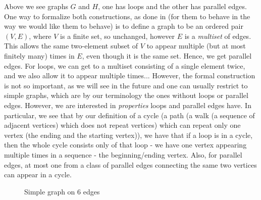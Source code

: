 Above we see graphs $G$ and $H$, one has loops and the other has parallel edges. One way to formalize both constructions, as done in \cite{oxley1} (for them to behave in the way we would like them to behave) is to define a graph to be an ordered pair $(V, E)$, where $V$ is a finite set, so unchanged, however $E$ is a \textit{multiset} of edges. This allows the same two-element subset of $V$ to appear multiple (but at most finitely many) times in $E$, even though it is the same set. Hence, we get parallel edges. For loops, we can get to a multiset consisting of a single element twice, and we also allow it to appear multiple times...
However, the formal construction is not so important, as we will see in the future and one can usually restrict to simple graphs, which are by our terminology the ones without loops or parallel edges. However, we are interested in \textit{properties} loops and parallel edges have. In particular, we see that by our definition of a cycle (a path (a walk (a sequence of adjacent vertices) which does not repeat vertices) which can repeat only one vertex (the ending and the starting vertex)), we have that if a loop is in a cycle, then the whole cycle consists only of that loop - we have one vertex appearing multiple times in a sequence - the beginning/ending vertex. Also, for parallel edges, at most one from a class of parallel edges connecting the same two vertices can appear in a cycle.


\begin{figure}[H]
\centering

\caption{Simple graph on 6 edges}
  \label{simp}

\end{figure}

